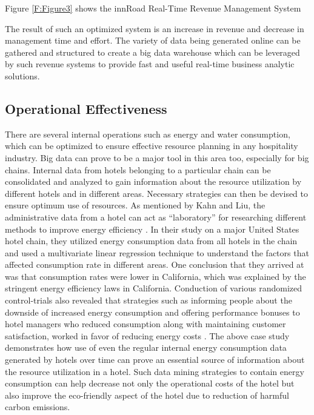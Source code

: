 \documentclass[sigconf]{acmart}
\begin{document}
Figure \ref{F:Figure3} shows the innRoad Real-Time Revenue Management System

The result of such an optimized system is an increase in revenue and decrease in management time and effort. The variety of data being generated online can be gathered and structured to create a big data warehouse which can be leveraged by such revenue systems to provide fast and useful real-time business analytic solutions.

\subsection{Operational Effectiveness}
There are several internal operations such as energy and water consumption, which can be optimized to ensure effective resource planning in any hospitality industry. Big data can prove to be a major tool in this area too, especially for big chains. Internal data from hotels belonging to a particular chain can be consolidated and analyzed to gain information about the resource utilization by different hotels and in different areas. Necessary strategies can then be devised to ensure optimum use of resources.
\newline As mentioned by Kahn and Liu, the administrative data from a hotel can act as ``laboratory'' for researching different methods to improve energy efficiency \cite {kahnliu10}. In their study on a major United States hotel chain, they utilized energy consumption data from all hotels in the chain and used a multivariate linear regression technique to understand the factors that affected consumption rate in different areas. One conclusion that they arrived at was that consumption rates were lower in California, which was explained by the stringent energy efficiency laws in California. Conduction of various randomized control-trials also revealed that strategies such as informing people about the downside of increased energy consumption and offering performance bonuses to hotel managers who reduced consumption along with maintaining customer satisfaction, worked in favor of reducing energy costs \cite {kahnliu10}.
\newline The above case study demonstrates how use of even the regular internal energy consumption data generated by hotels over time can prove an essential source of information about the resource utilization in a hotel. Such data mining strategies to contain energy consumption can help decrease not only the operational costs of the hotel but also improve the eco-friendly aspect of the hotel due to reduction of harmful carbon emissions.
\end{document}
